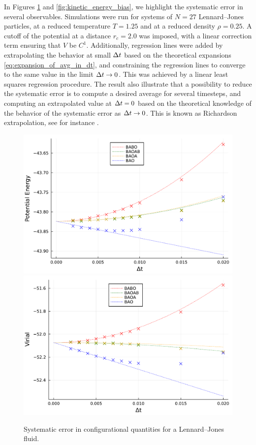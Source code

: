     In Figures \ref{fig:configurational_bias} and \ref{fig:kinetic_energy_bias}, we highlight the systematic error in several observables. Simulations were run for systems of $N=27$ Lennard--Jones particles, at a reduced temperature $T=1.25$ and at a reduced density $\rho=0.25$. 
    A cutoff of the potential at a distance $r_c=2.0$ was imposed, with a linear correction term ensuring that $V$ be $C^1$. 
    Additionally, regression lines were added by extrapolating the behavior at small ${\Delta t}$ based on the theoretical expansions \eqref{eq:expansion_of_avg_in_dt}, and constraining the regression lines to converge to the same value in the limit ${\Delta t}\to 0$.
    This was achieved by a linear least squares regression procedure.
    The result also illustrate that a possibility to reduce the systematic error is to compute a desired average for several timesteps, and computing an extrapolated value at ${\Delta t}=0$ based on the theoretical knowledge of the behavior of the systematic error as ${\Delta t}\to 0$. This is known as Richardson extrapolation, see for instance \cite[Section 9.6]{QSS10}.
\begin{figure}[htbp]
    \begin{center}
      \includegraphics[width=0.49\linewidth]{figures/chapter1/potential_energy_bias.pdf}
      \includegraphics[width=0.49\linewidth]{figures/chapter1/virial_bias.pdf}
      \caption{ \label{fig:configurational_bias}
        Systematic error in configurational quantities for a Lennard--Jones fluid.
      }
    \end{center}
  \end{figure}

